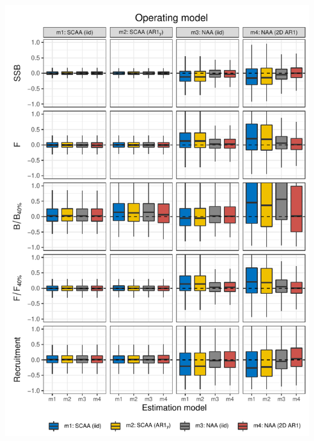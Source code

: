 \documentclass[]{article}
\begin{document}
\includegraphics[width=6in]{wham-sim-paper_files/figure-latex/unnamed-chunk-3-5}

\pagebreak
\end{document}
